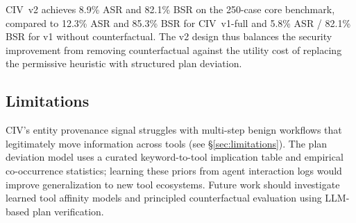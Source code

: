 CIV~v2 achieves 8.9\% ASR and 82.1\% BSR on the 250-case core benchmark, compared to 12.3\% ASR and 85.3\% BSR for CIV~v1-full and 5.8\% ASR / 82.1\% BSR for v1 without counterfactual.
The v2 design thus balances the security improvement from removing counterfactual against the utility cost of replacing the permissive heuristic with structured plan deviation.

\subsection{Limitations}

CIV's entity provenance signal struggles with multi-step benign workflows that legitimately move information across tools (see \S\ref{sec:limitations}).
The plan deviation model uses a curated keyword-to-tool implication table and empirical co-occurrence statistics; learning these priors from agent interaction logs would improve generalization to new tool ecosystems.
Future work should investigate learned tool affinity models and principled counterfactual evaluation using LLM-based plan verification.

